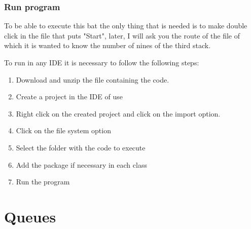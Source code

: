 \documentclass[a4paper]{article}
\theoremstyle{plain}
\theoremstyle{definition}
\begin{document}
        \subsubsection{Run program}
        To be able to execute this bat the only thing that is needed is to make double click in the file that puts "Start", later, I will ask you the route of the file of which it is wanted to know the number of nines of the third stack.\newline
	
        To run in any IDE it is necessary to follow the following steps:
        \begin{enumerate}
            \item Download and unzip the file containing the code.
            \item Create a project in the IDE of use
            \item Right click on the created project and click on the import option. 
            \item Click on the file system option 
            \item Select the folder with the code to execute
            \item Add the package if necessary in each class
            \item Run the program
        \end{enumerate}
	
	
        
	\newpage
	\section{Queues}
\end{document}
